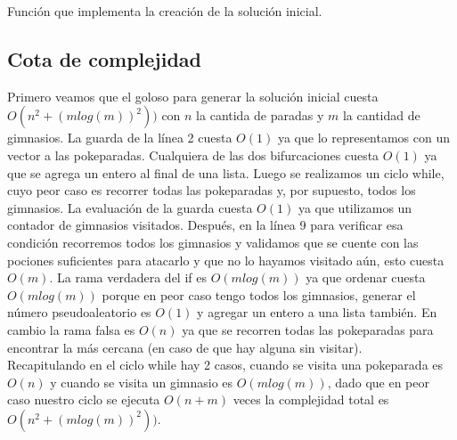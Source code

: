 \SetAlgoLined
{}
\begin{algorithm}[H]
	\label{algo: ejercicio4_golosopseudocodigo}
	\caption{Función que implementa la creaci\'on de la soluci\'on inicial.}
\end{algorithm}


\subsection{Cota de complejidad}
Primero veamos que el goloso para generar la soluci\'on inicial cuesta $O(n^2+(mlog(m))^2))$ con $n$ la cantida de paradas y $m$ la cantidad de gimnasios. La guarda de la l\'inea 2 cuesta $O(1)$ ya que lo representamos con un vector a las pokeparadas. Cualquiera de las dos bifurcaciones cuesta $O(1)$ ya que se agrega un entero al final de una lista. Luego se realizamos un ciclo while, cuyo peor caso es recorrer todas las pokeparadas y, por supuesto, todos los gimnasios. La evaluaci\'on de la guarda cuesta $O(1)$ ya que utilizamos un contador de gimnasios visitados. Despu\'es, en la l\'inea 9 para verificar esa condici\'on recorremos todos los gimnasios y validamos que se cuente con las pociones suficientes para atacarlo y que no lo hayamos visitado a\'un, esto cuesta $O(m)$. La rama verdadera del if es $O(mlog(m))$ ya que ordenar cuesta $O(mlog(m))$ porque en peor caso tengo todos los gimnasios, generar el n\'umero pseudoaleatorio es $O(1)$ y agregar un entero a una lista tambi\'en. En cambio la rama falsa es $O(n)$ ya que se recorren todas las pokeparadas para encontrar la m\'as cercana (en caso de que hay alguna sin visitar). \\
Recapitulando en el ciclo while hay 2 casos, cuando se visita una pokeparada es $O(n)$ y cuando se visita un gimnasio es $O(mlog(m))$, dado que en peor caso nuestro ciclo se ejecuta $O(n+m)$ veces la complejidad total es $O(n^2+(mlog(m))^2))$.

